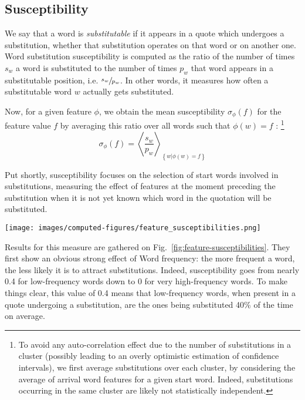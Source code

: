 \subsection{Susceptibility}

We say that a word is \emph{substitutable} if it appears in a quote which undergoes a substitution, whether that substitution operates on that word or on another one.
Word substitution susceptibility is computed as the ratio of the number of times $s_w$ a word is substituted to the number of times $p_w$ that word appears in a substitutable position, \hbox{i.e.} $\sfrac{s_w}{p_w}$. In other words, it measures how often a substitutable word $w$ actually gets substituted.

Now, for a given feature $\phi$, we obtain the mean susceptibility $\sigma_{\phi}(f)$ for the feature value $f$ by averaging this ratio over all words such that $\phi(w) = f$%
:
\footnote{To avoid any auto-correlation effect due to the number of substitutions in a cluster (possibly leading to an overly optimistic estimation of confidence intervals), we first average substitutions over each cluster, by considering the average of arrival word features for a given start word.
Indeed, substitutions occurring in the same cluster are likely not statistically independent.}
$$\sigma_{\phi}(f) = \left< \frac{s_w}{p_w} \right>_{\left\lbrace w | \phi(w) = f \right\rbrace}$$

Put shortly, susceptibility focuses on the selection of start words involved in substitutions, measuring the effect of features at the moment preceding the substitution when it is not yet known which word in the quotation will be substituted.

\begin{figure*}[!th]
    \centering
    \texttt{[image: images/computed-figures/feature\_susceptibilities.png]}
    \caption{\textbf{Substitution susceptibility:} average susceptibility to substitution vs. average feature value of a candidate word for substitution, with 95\% asymptotic confidence intervals.
    The heatmap on the lower-right shows the joint effect of Age of acquisition and Number of phonemes on susceptibility, averaged over the respective single-variable ranges, with sample size (word numbers) in parentheses.
    Without the rather unsignificant cells (11 words or less), the heatmap shows no specific trend in one direction or the other.}
    \label{fig:feature-susceptibilities}
\end{figure*}
\medskip
Results for this measure are gathered on Fig.~\ref{fig:feature-susceptibilities}. They first show an obvious strong effect of Word frequency: the more frequent a word, the less likely it is to attract substitutions.
Indeed, susceptibility goes from nearly 0.4 for low-frequency words down to 0 for very high-frequency words.
To make things clear, this value of 0.4 means that low-frequency words, when present in a quote undergoing a substitution, are the ones being substituted 40\% of the time on average.

